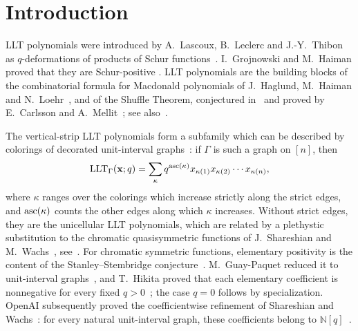 \section{Introduction}\label{sec:introduction}

LLT polynomials were introduced by A.~Lascoux, B.~Leclerc and J.-Y.~Thibon as
$q$-deformations of products of Schur functions~\cite{LLT1997}.
I.~Grojnowski and M.~Haiman proved that they are Schur-positive
\cite{GrojnowskiHaiman2006}.
LLT polynomials are the building blocks of the combinatorial formula for
Macdonald polynomials of J.~Haglund, M.~Haiman and
N.~Loehr~\cite{HaglundHaimanLoehr2005}, and of the Shuffle Theorem, conjectured
in~\cite{HaglundHaimanLoehrRemmelUlyanov2005} and proved by E.~Carlsson and
A.~Mellit~\cite{CarlssonMellit2017}; see also~\cite{qtCatalanBook}.

The vertical-strip LLT polynomials form a subfamily which can be described by
colorings of decorated unit-interval graphs~\cite{AlexanderssonPanova2018}: if
$\Gamma$ is such a graph on $[n]$, then
\[
 \operatorname{LLT}_\Gamma(\mathbf{x};q)=\sum_\kappa q^{\operatorname{asc}(\kappa)}x_{\kappa(1)}x_{\kappa(2)}\dotsm x_{\kappa(n)},
\]
where $\kappa$ ranges over the colorings which increase strictly along the
strict edges, and $\operatorname{asc}(\kappa)$ counts the other edges along which $\kappa$
increases.
Without strict edges, they are the unicellular LLT polynomials, which are
related by a plethystic substitution to the chromatic quasisymmetric functions of
J.~Shareshian and M.~Wachs~\cite{ShareshianWachs2012,ShareshianWachs2016},
see~\cite{CarlssonMellit2017,GuayPaquet2016x}.
For chromatic symmetric functions, elementary positivity is the content of the
Stanley--Stembridge conjecture~\cite{StanleyStembridge1993,Stanley1995}.
M.~Guay-Paquet reduced it to unit-interval graphs~\cite{GuayPaquet2013}, and
T.~Hikita proved that each elementary coefficient is nonnegative for every
fixed $q>0$~\cite[Cor.~1.2]{Hikita2026}; the case $q=0$ follows by
specialization.
OpenAI subsequently proved the coefficientwise refinement of Shareshian and
Wachs~\cite{ShareshianWachs2016}: for every natural unit-interval graph, these
coefficients belong to $\mathbb{N}[q]$~\cite[Thm.~1.1]{OpenAI2026}.

